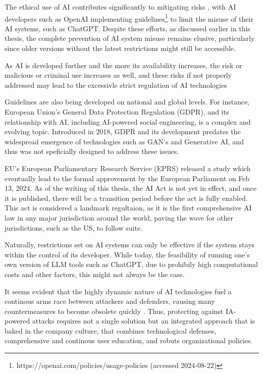 The ethical use of AI contributes significantly to mitigating risks \citep{guptaFromChatGPTtoThreatGPT2023}, with AI developers such as OpenAI implementing guidelines\footnote{https://openai.com/policies/usage-policies (accessed 2024-08-22)} to limit the misuse of their AI systems, such as ChatGPT. Despite these efforts, as discussed earlier in this thesis, the complete prevention of AI system misuse remains elusive, particularly since older versions without the latest restrictions might still be accessible.

As AI is developed further and the more its availability increases, the risk or malicious or criminal use increases as well, and these risks if not properly addressed may lead to the excessivle strict regulation of AI technologies \citep{king_AI_Crime_Interdisciplinary_Analysis_2019}

Guidelines are also being developed on national and global levels. For instance, European Union's General Data Protection Regulation (GDPR), and its relationship with AI, including AI-powered social engineering, is a complex and evolving topic. Introduced in 2018, GDPR and its development predates the widespread emergence of technologies such as GAN's and Generative AI\citep{goodfellowGenerativeAdversarialNetworks2020}, and thus was not speficially designed to address these issues.

EU's European Parliamentary Research Service (EPRS) released a study\citep{eprsTheImpactofTheGDPR2020} which eventually lead to the formal approvement by the European Parliament on Feb 13, 2024. As of the writing of this thesis, the AI Act is not yet in effect, and once it is published, there will be a transition period before the act is fully enabled. This act is considered a landmark regultaion, as it is the first comprehensive AI law in any major jurisdiction around the world, paving the wave for other jurisdictions, such as the US,  to follow suite.

Naturally, restrictions set on AI systems can only be effective if the system stays within the control of its developer.  While today, the feasibility of running one's own version of LLM tools such as ChatGPT, due to prohibily high computational costs and other factors, this might not always be the case.

It seems evident that the highly dynamic nature of AI technologies fuel a continous arms race between attackers and defenders, causing many countermeasures to become obsolete quickly \citep{fakhouriAIDrivenSolutionsForSocialEngineeringAttacks2024}. Thus, protecting against IA-powered attacks requires not a single solution but an integrated approach that is baked in the company culture, that combines technological defenses, comprehensive and continous user education, and robuts organizational policies.

